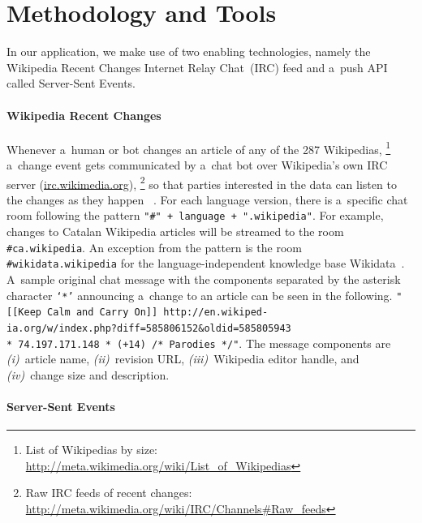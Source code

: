 \documentclass{sig-alternate}
\newcommand{\inlinelistingsize}{\fontsize{8pt}{11pt}}
\let\oldurl\url
\renewcommand{\url}[1]{\inlinelistingsize\oldurl{#1}}
\begin{document}
\section{Methodology and Tools}

In our application, we make use of two enabling technologies,
namely the Wikipedia Recent Changes Internet Relay Chat~(IRC) feed
and a~push API called Server-Sent Events.

\paragraph{Wikipedia Recent Changes}

Whenever a~human or bot changes an article
of any of the 287 Wikipedias,%
\footnote{List of Wikipedias by size:
\url{http://meta.wikimedia.org/wiki/List_of_Wikipedias}}
a~change event gets communicated by a~chat bot
over Wikipedia's own IRC server (\url{irc.wikimedia.org}),%
\footnote{Raw IRC feeds of recent changes:
\url{http://meta.wikimedia.org/wiki/IRC/Channels\#Raw_feeds}}
so that parties interested in the data
can listen to the changes as they happen%
~\cite{steiner2013mjnomore}.
For each language version, there is
a~specific chat room following the pattern
\texttt{"\#" + language + ".wikipedia"}.
For example, changes to Catalan Wikipedia articles
will be streamed to the room \texttt{\#ca.wikipedia}.
An exception from the pattern is the room
\texttt{\#wikidata.wikipedia} for the language-independent
knowledge base Wikidata~\cite{vrandecic2012wikidata}.
A~sample original chat message with the components separated
by the asterisk character \texttt{`*'}
announcing a~change to an article
can be seen in the following.
\texttt{"[[Keep Calm and Carry On]] http://en.wikiped-\\ ia.org/w/index.php?diff=585806152\&oldid=585805943 \\* 74.197.171.148 * (+14) /* Parodies */"}.
The message components are \emph{(i)}~article name, \emph{(ii)}~revision URL,
\emph{(iii)}~Wiki\-pedia editor handle, and
\emph{(iv)}~change size and description.

\paragraph{Server-Sent Events}
\end{document}
